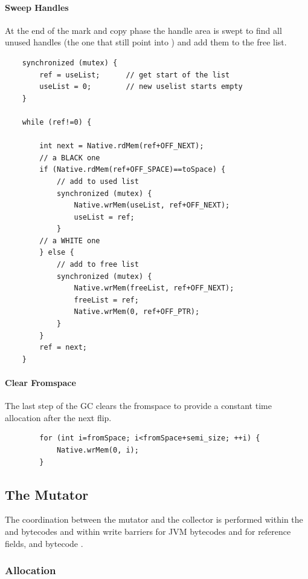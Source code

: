 \paragraph{Sweep Handles} At the end of the mark and copy phase the
handle area is swept to find all unused handles (the one that still
point into ) and add them to the free list.
%
\begin{lstlisting}
    synchronized (mutex) {
        ref = useList;      // get start of the list
        useList = 0;        // new uselist starts empty
    }

    while (ref!=0) {

        int next = Native.rdMem(ref+OFF_NEXT);
        // a BLACK one
        if (Native.rdMem(ref+OFF_SPACE)==toSpace) {
            // add to used list
            synchronized (mutex) {
                Native.wrMem(useList, ref+OFF_NEXT);
                useList = ref;
            }
        // a WHITE one
        } else {
            // add to free list
            synchronized (mutex) {
                Native.wrMem(freeList, ref+OFF_NEXT);
                freeList = ref;
                Native.wrMem(0, ref+OFF_PTR);
            }
        }
        ref = next;
    }
\end{lstlisting}

\paragraph{Clear Fromspace} The last step of the GC clears the
fromspace to provide a constant time allocation after the next flip.
%
\begin{lstlisting}
        for (int i=fromSpace; i<fromSpace+semi_size; ++i) {
            Native.wrMem(0, i);
        }
\end{lstlisting}

\subsection{The Mutator}

The coordination between the mutator and the collector is performed
within the  and  bytecodes and within write
barriers for JVM bytecodes  and  for
reference fields, and bytecode .

\subsubsection{Allocation}

